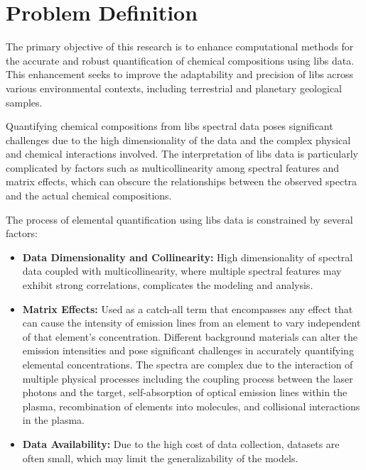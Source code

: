 \section{Problem Definition}\label{sec:problem_definition}
The primary objective of this research is to enhance computational methods for the accurate and robust quantification of chemical compositions using \gls{libs} data.
This enhancement seeks to improve the adaptability and precision of \gls{libs} across various environmental contexts, including terrestrial and planetary geological samples.

Quantifying chemical compositions from \gls{libs} spectral data poses significant challenges due to the high dimensionality of the data and the complex physical and chemical interactions involved. The interpretation of \gls{libs} data is particularly complicated by factors such as multicollinearity among spectral features and matrix effects, which can obscure the relationships between the observed spectra and the actual chemical compositions.

The process of elemental quantification using \gls{libs} data is constrained by several factors:
\begin{itemize}
    \item \textbf{Data Dimensionality and Collinearity:} High dimensionality of spectral data coupled with multicollinearity, where multiple spectral features may exhibit strong correlations, complicates the modeling and analysis\cite{andersonImprovedAccuracyQuantitative2017}.
    \item \textbf{Matrix Effects:} Used as a catch-all term that encompasses any effect that can cause the intensity of emission lines from an element to vary independent of that element's concentration. Different background materials can alter the emission intensities and pose significant challenges in accurately quantifying elemental concentrations. The spectra are complex due to the interaction of multiple physical processes including the coupling process between the laser photons and the target, self-absorption of optical emission lines within the plasma, recombination of elements into molecules, and collisional interactions in the plasma\cite{cleggRecalibrationMarsScience2017, andersonImprovedAccuracyQuantitative2017}.
    \item \textbf{Data Availability:} Due to the high cost of data collection, datasets are often small, which may limit the generalizability of the models\cite{p9_paper}.
\end{itemize}


